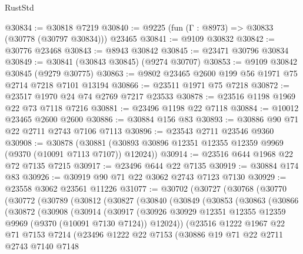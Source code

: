 \begin{lexlean}{RustStd}
\begin{coremodule}
{\begin{coremodule}
{{{{{{{{{{{{{{{{{{{{{{{{{{{{{{{{{{{{{{{@30834 := @30818 @7219
@30840 := @9225 (fun (Γ : @8973) => @30833 (@30778 (@30797 @30834))) @23465
@30841 := @9109 @30832
@30842 := @30776 @23468
@30843 := @8943 @30842
@30845 := @23471 @30796 @30834
@30849 := @30841 (@30843 @30845) (@9274 @30707)
@30853 := @9109 @30842 @30845 (@9279 @30775)
@30863 := @9802 @23465 @2600 @199 @56 @1971 @75 @2714 @7218 @7101 @13194
@30866 := @23511 @1971 @75 @7218
@30872 := @23517 @1970 @24 @74 @2769 @7217 @23533
@30878 := @23516 @1198 @1969 @22 @73 @7118 @7216
@30881 := @23496 @1198 @22 @7118
@30884 := @10012 @23465 @2600 @2600
@30886 := @30884 @156 @83
@30893 := @30886 @90 @71 @22 @2711 @2743 @7106 @7113
@30896 := @23543 @2711 @23546 @9360
@30908 := @30878
    (@30881 (@30893 @30896 @12351 @12355 @12359 @9969 (@9370 (@10091 @7113 @7107)) @12024))
@30914 := @23516 @644 @1968 @22 @72 @7135 @7215
@30917 := @23496 @644 @22 @7135
@30919 := @30884 @174 @83
@30926 := @30919 @90 @71 @22 @3062 @2743 @7123 @7130
@30929 := @23558 @3062 @23561 @11226
@31077 := @30702
    (@30727
      (@30768
        (@30770
          (@30772
            (@30789
              (@30812
                (@30827
                  (@30840
                    (@30849
                      (@30853
                        (@30863
                          (@30866
                            (@30872
                              (@30908
                                (@30914
                                  (@30917
                                    (@30926
                                      @30929
                                      @12351
                                      @12355
                                      @12359
                                      @9969
                                      (@9370 (@10091 @7130 @7124))
                                      @12024))
                                  (@23516
                                    @1222
                                    @1967
                                    @22
                                    @71
                                    @7153
                                    @7214
                                    (@23496
                                      @1222
                                      @22
                                      @7153
                                      (@30886
                                        @19
                                        @71
                                        @22
                                        @2711
                                        @2743
                                        @7140
                                        @7148
}}}}}}}}}}}}}}}}}}}}}}}}}}}}}}}}}}}}}}}
\end{coremodule}}
\end{coremodule}
\end{lexlean}
